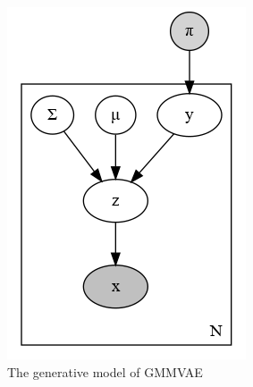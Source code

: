 \documentclass[11pt, a4paper]{report}
\theoremstyle{plain}
\theoremstyle{definition}
\theoremstyle{remark}
\begin{document}
\begin{figure}[!h]
\begin{framed}
\centering
\begin{subfigure}[b]{0.4\textwidth}
\includegraphics[width=\textwidth]{plots/mmpd.gv.png}
\caption{The generative model of GMMVAE~\cite{dilokthanakul2016deep}}
\label{fig:dilomix}
\end{subfigure}
\begin{subfigure}[b]{0.4\textwidth}

\end{subfigure}
\end{framed}
\end{figure}
\end{document}
